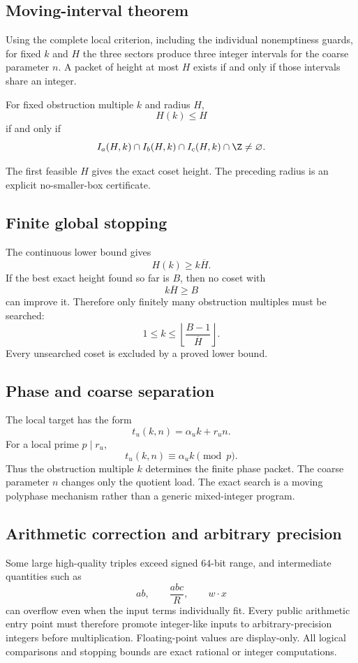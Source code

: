 \subsection{Moving-interval theorem}
Using the complete local criterion, including the individual nonemptiness guards, for fixed $k$ and $H$ the three sectors produce three integer intervals for the coarse parameter $n$. A packet of height at most $H$ exists if and only if those intervals share an integer.

\begin{theorem}
For fixed obstruction multiple $k$ and radius $H$,
\[
 H(k)\le H
\]
if and only if
\[
 I_a(H,k)
 \cap
 I_b(H,k)
 \cap
 I_c(H,k)
 \cap\Z
 \neq\varnothing.
\]
\end{theorem}

The first feasible $H$ gives the exact coset height. The preceding radius is an explicit no-smaller-box certificate.

\subsection{Finite global stopping}
The continuous lower bound gives
\[
 H(k)\ge k\overline H.
\]
If the best exact height found so far is $B$, then no coset with
\[
 k\overline H\ge B
\]
can improve it. Therefore only finitely many obstruction multiples must be searched:
\[
 \boxed{
 1\le k\le
 \left\lfloor\frac{B-1}{\overline H}\right\rfloor.
 }
\]
Every unsearched coset is excluded by a proved lower bound.

\subsection{Phase and coarse separation}
The local target has the form
\[
 t_u(k,n)=\alpha_uk+r_un.
\]
For a local prime $p\mid r_u$,
\[
 t_u(k,n)\equiv\alpha_uk\pmod p.
\]
Thus the obstruction multiple $k$ determines the finite phase packet. The coarse parameter $n$ changes only the quotient load. The exact search is a moving polyphase mechanism rather than a generic mixed-integer program.

\subsection{Arithmetic correction and arbitrary precision}
Some large high-quality triples exceed signed $64$-bit range, and intermediate quantities such as
\[
 ab,
 \qquad
 \frac{abc}{R},
 \qquad
 w\cdot x
\]
can overflow even when the input terms individually fit. Every public arithmetic entry point must therefore promote integer-like inputs to arbitrary-precision integers before multiplication. Floating-point values are display-only. All logical comparisons and stopping bounds are exact rational or integer computations.

